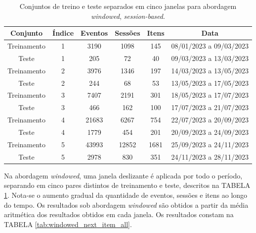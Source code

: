 \begin{table}[htbp]
  \centering
  \begin{tabular}{|c|c|c|c|c|c|}
    \hline
    Conjunto & Índice & Eventos & Sessões & Itens & Data\\
    \hline
    Treinamento & 1 & 3190 & 1098 & 145 & 08/01/2023 a 09/03/2023\\
    \hline
    Teste & 1 & 205 & 72 & 40 & 09/03/2023 a 13/03/2023\\
    \hline
    Treinamento & 2 & 3976 & 1346 & 197 & 14/03/2023 a 13/05/2023\\
    \hline
    Teste & 2 & 244 & 68 & 53 & 13/05/2023 a 17/05/2023\\
    \hline
    Treinamento & 3 & 7407 & 2191 & 301 & 18/05/2023 a 17/07/2023\\
    \hline
    Teste & 3 & 466 & 162 & 100 & 17/07/2023 a 21/07/2023\\
    \hline
    Treinamento & 4 & 21683 & 6267 & 754 & 22/07/2023 a 20/09/2023\\
    \hline
    Teste & 4 & 1779 & 454 & 201 & 20/09/2023 a 24/09/2023\\
    \hline
    Treinamento & 5 & 43993 & 12852 & 1681 & 25/09/2023 a 24/11/2023\\
    \hline
    Teste & 5 & 2978 & 830 & 351 & 24/11/2023 a 28/11/2023\\
    \hline
  \end{tabular}
  \caption{Conjuntos de treino e teste separados em cinco janelas para abordagem \textit{windowed}, \textit{session-based}.}
  \label{tab:windowed_data}
\end{table}

Na abordagem
\textit{windowed}, uma janela deslizante é aplicada por todo o período,
separando em cinco pares distintos de treinamento e teste, descritos na TABELA
\ref{tab:windowed_data}. Nota-se o aumento gradual da quantidade de eventos,
sessões e itens ao longo do tempo. Os resultados sob abordagem \textit{windowed} são obtidos a partir da média
aritmética dos resultados obtidos em cada janela. Os resultados constam na
TABELA \ref{tab:windowed_next_item_all}.


